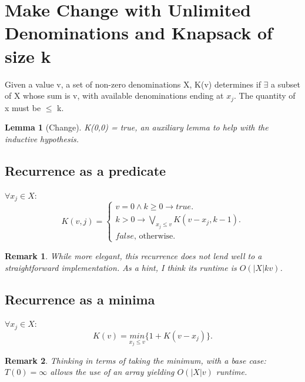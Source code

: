 \documentclass{article}
\newtheorem{lemma}[theorem]{Lemma}
\newtheorem{remark}{Remark}
\begin{document}
	
\section{Make Change with Unlimited Denominations and Knapsack of size k}
Given a value v, a set of non-zero denominations X, K(v) determines if $\exists$ a subset of X whose sum is v, with available denominations ending at $x_j$. The quantity of x must be $\leq$ k.

\begin{lemma} [Change]
\label{bc1}	
K(0,0) = true, an auxiliary lemma to help with the inductive hypothesis.
\end{lemma}

\subsection{Recurrence as a predicate}
$\forall x_j \in X$:\\
\begin{equation}
K(v,j)=			
\begin{cases}
v = 0 \land k \geq 0 \to true.\\	
k>0 \to \underset{x_j \leq v}{\bigvee} K(v-x_j, k-1).\\
false \text{, otherwise.}
\end{cases}
\end{equation}

\begin{remark}
While more elegant, this recurrence does not lend well to a straightforward implementation. As a hint, I think its runtime is $O(|X|kv)$.
\end{remark}

\subsection{Recurrence as a minima}
$\forall x_j \in X$:\\
\begin{equation}
K(v)=			
\underset{x_j \leq v}{min} \{1+K(v-x_j)\}.
\end{equation}

\begin{remark}
Thinking in terms of taking the minimum, with a base case: $T(0) = \infty$ allows the use of an array yielding $O(|X|v)$ runtime.
\end{remark}
\end{document}
